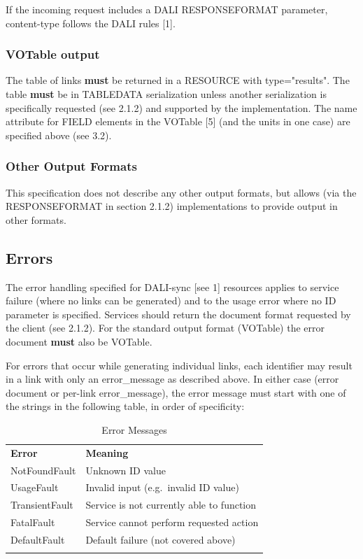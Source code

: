 \documentclass[11pt,a4paper]{ivoa}
\newcommand{\attval}[2]{#1={\allowbreak}{"}#2{"}}
\begin{document}
If the incoming request includes a DALI RESPONSEFORMAT parameter,
content-type follows the DALI rules [1].


\subsubsection{VOTable output}

The table of links {\bf must} be returned in a RESOURCE with
\attval{type}{results}. The table {\bf must} be in TABLEDATA serialization
unless another serialization is specifically requested (see 2.1.2)
and supported by the implementation.
The name attribute for FIELD elements in the VOTable [5]
(and the units in one case) are specified above (see 3.2).


\subsubsection{Other Output Formats}

This specification does not describe any other output formats, but allows
(via the RESPONSEFORMAT in section 2.1.2) implementations to provide
output in other formats.


\subsection{Errors}

The error handling specified for DALI-sync [see 1] resources applies
to service failure (where no links can be generated) and to the usage
error where no ID parameter is specified. Services should return the
document format requested by the client (see 2.1.2). For the standard
output format (VOTable) the error document {\bf must} also be VOTable.

For errors that occur while generating individual links, each
identifier may result in a link with only an error\_message
as described above.
In either case (error document or per-link error\_message),
the error message must start with one of the strings in the
following table, in order of specificity:
\begin{table}[h]
\begin{center}
\begin{tabular}{|l|l|}
\sptablerule
{\bf Error} & {\bf Meaning} \\
\sptablerule
NotFoundFault  & Unknown ID value    \\
UsageFault     & Invalid input (e.g.\ invalid ID value) \\
TransientFault & Service is not currently able to function \\
FatalFault     & Service cannot perform requested action \\
DefaultFault   & Default failure (not covered above) \\
\sptablerule
\end{tabular}
\end{center}
\caption{Error Messages}
\end{table}
\end{document}
